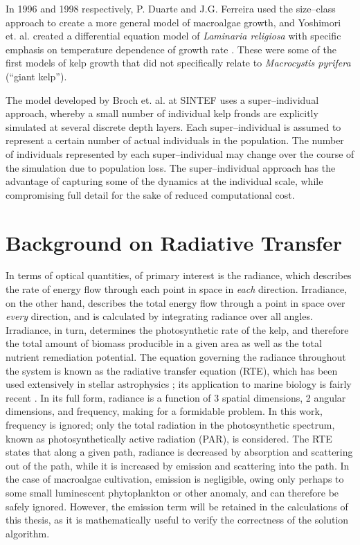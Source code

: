 In 1996 and 1998 respectively, P. Duarte and J.G. Ferreira used the size--class approach to create a more general model of macroalgae growth, and Yoshimori et. al. created a differential equation model of \textit{Laminaria religiosa} with specific emphasis on temperature dependence of growth rate \cite{duarte_model_1997,yoshimori_mathematical_1998}.
These were some of the first models of kelp growth that did not specifically relate to \textit{Macrocystis pyrifera} (``giant kelp'').

The model developed by Broch et. al. at SINTEF \cite{broch_modelling_2013, broch_modelling_2012, handa_seasonal_2013} uses a super--individual approach, whereby a small number of individual kelp fronds are explicitly simulated at several discrete depth layers.
Each super--individual is assumed to represent a certain number of actual individuals in the population.
The number of individuals represented by each super--individual may change over the course of the simulation due to population loss.
The super--individual approach has the advantage of capturing some of the dynamics at the individual scale, while compromising full detail for the sake of reduced computational cost.

\section{Background on Radiative Transfer}
In terms of optical quantities, of primary interest is the radiance, which describes the rate of energy flow through each point in space in \textit{each} direction.
Irradiance, on the other hand, describes the total energy flow through a point in space over \textit{every} direction, and is calculated by integrating radiance over all angles.
Irradiance, in turn, determines the photosynthetic rate of the kelp, and therefore the total amount of biomass producible in a given area as well as the total nutrient remediation potential.
The equation governing the radiance throughout the system is known as the radiative transfer equation (RTE), which has been used extensively in stellar astrophysics \cite{chandrasekhar_radiative_1960,petkova_novel_2011}; its application to marine biology is fairly recent \cite{mobley_radiative_2001}.
In its full form, radiance is a function of 3 spatial dimensions, 2 angular dimensions, and frequency, making for a formidable problem.
In this work, frequency is ignored; only the total radiation in the photosynthetic spectrum, known as photosynthetically active radiation (PAR), is considered.
The RTE states that along a given path, radiance is decreased by absorption and scattering out of the path, while it is increased by emission and scattering into the path.
In the case of macroalgae cultivation, emission is negligible, owing only perhaps to some small luminescent phytoplankton or other anomaly, and can therefore be safely ignored.
However, the emission term will be retained in the calculations of this thesis, as it is mathematically useful to verify the correctness of the solution algorithm.

